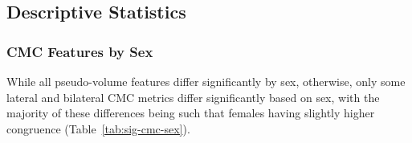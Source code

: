 \documentclass{article}
\begin{document}


\subsection{Descriptive Statistics}

\subsubsection{CMC Features by Sex}

While all pseudo-volume features differ significantly by sex, otherwise,
only some lateral and bilateral CMC metrics differ significantly based on
sex, with the majority of these differences being such that females having
slightly higher congruence (Table~\ref{tab:sig-cmc-sex}).
\end{document}
